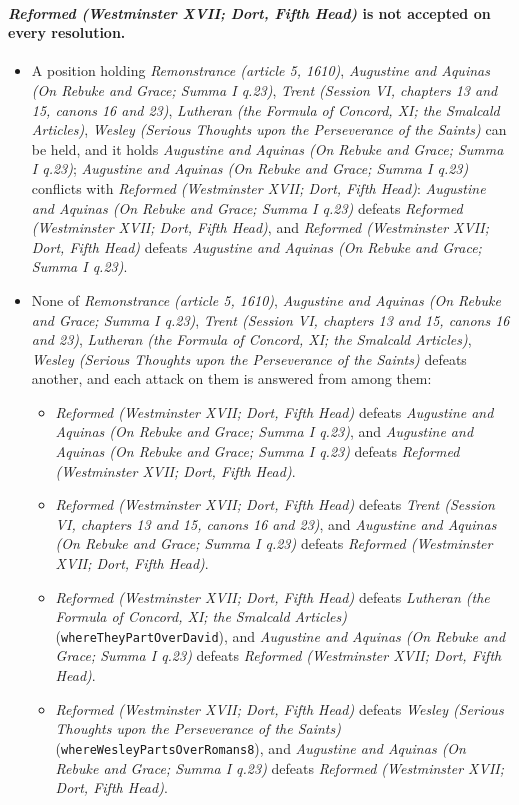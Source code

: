 \documentclass[11pt]{article}
\begin{document}
\paragraph{\emph{Reformed (Westminster XVII; Dort, Fifth Head)} is not accepted on every resolution.}
\begin{itemize}
\item A position holding \emph{Remonstrance (article 5, 1610)}, \emph{Augustine and Aquinas (On Rebuke and Grace; Summa I q.23)}, \emph{Trent (Session VI, chapters 13 and 15, canons 16 and 23)}, \emph{Lutheran (the Formula of Concord, XI; the Smalcald Articles)}, \emph{Wesley (Serious Thoughts upon the Perseverance of the Saints)} can be held, and it holds \emph{Augustine and Aquinas (On Rebuke and Grace; Summa I q.23)}; \emph{Augustine and Aquinas (On Rebuke and Grace; Summa I q.23)} conflicts with \emph{Reformed (Westminster XVII; Dort, Fifth Head)}: \emph{Augustine and Aquinas (On Rebuke and Grace; Summa I q.23)} defeats \emph{Reformed (Westminster XVII; Dort, Fifth Head)}, and \emph{Reformed (Westminster XVII; Dort, Fifth Head)} defeats \emph{Augustine and Aquinas (On Rebuke and Grace; Summa I q.23)}.
\item None of \emph{Remonstrance (article 5, 1610)}, \emph{Augustine and Aquinas (On Rebuke and Grace; Summa I q.23)}, \emph{Trent (Session VI, chapters 13 and 15, canons 16 and 23)}, \emph{Lutheran (the Formula of Concord, XI; the Smalcald Articles)}, \emph{Wesley (Serious Thoughts upon the Perseverance of the Saints)} defeats another, and each attack on them is answered from among them:
\begin{itemize}
\item \emph{Reformed (Westminster XVII; Dort, Fifth Head)} defeats \emph{Augustine and Aquinas (On Rebuke and Grace; Summa I q.23)}, and \emph{Augustine and Aquinas (On Rebuke and Grace; Summa I q.23)} defeats \emph{Reformed (Westminster XVII; Dort, Fifth Head)}.
\item \emph{Reformed (Westminster XVII; Dort, Fifth Head)} defeats \emph{Trent (Session VI, chapters 13 and 15, canons 16 and 23)}, and \emph{Augustine and Aquinas (On Rebuke and Grace; Summa I q.23)} defeats \emph{Reformed (Westminster XVII; Dort, Fifth Head)}.
\item \emph{Reformed (Westminster XVII; Dort, Fifth Head)} defeats \emph{Lutheran (the Formula of Concord, XI; the Smalcald Articles)} (\texttt{where\allowbreak{}They\allowbreak{}Part\allowbreak{}Over\allowbreak{}David}), and \emph{Augustine and Aquinas (On Rebuke and Grace; Summa I q.23)} defeats \emph{Reformed (Westminster XVII; Dort, Fifth Head)}.
\item \emph{Reformed (Westminster XVII; Dort, Fifth Head)} defeats \emph{Wesley (Serious Thoughts upon the Perseverance of the Saints)} (\texttt{where\allowbreak{}Wesley\allowbreak{}Parts\allowbreak{}Over\allowbreak{}Romans8}), and \emph{Augustine and Aquinas (On Rebuke and Grace; Summa I q.23)} defeats \emph{Reformed (Westminster XVII; Dort, Fifth Head)}.
\end{itemize}
\end{itemize}
\end{document}
